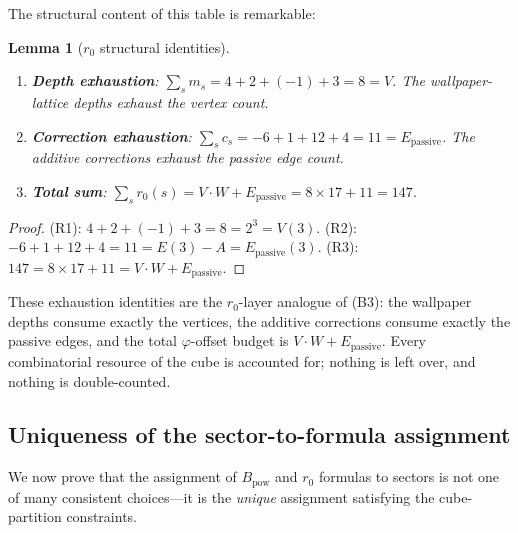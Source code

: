 \documentclass[11pt,a4paper]{article}
\newtheorem{lemma}[theorem]{Lemma}
\theoremstyle{definition}
\theoremstyle{remark}
\newcommand{\phig}{\varphi}
\newcommand{\Epass}{E_{\mathrm{passive}}}
\begin{document}
The structural content of this table is remarkable:

\begin{lemma}[$r_0$ structural identities]
\label{lem:r0_identities}
\leavevmode
\begin{enumerate}[nosep,label=(R\arabic*)]
  \item \textbf{Depth exhaustion}:
    $\sum_s m_s = 4 + 2 + (-1) + 3 = 8 = V$.
    The wallpaper-lattice depths exhaust the vertex count.
  \item \textbf{Correction exhaustion}:
    $\sum_s c_s = -6 + 1 + 12 + 4 = 11 = \Epass$.
    The additive corrections exhaust the passive edge count.
  \item \textbf{Total sum}:
    $\sum_s r_0(s) = V \cdot W + \Epass = 8 \times 17 + 11 = 147$.
\end{enumerate}
\end{lemma}

\begin{proof}
(R1): $4 + 2 + (-1) + 3 = 8 = 2^3 = V(3)$.\;
(R2): $-6 + 1 + 12 + 4 = 11 = E(3) - A = \Epass(3)$.\;
(R3): $147 = 8 \times 17 + 11 = V \cdot W + \Epass$.
\end{proof}

\noindent
These exhaustion identities are the $r_0$-layer analogue of (B3): the
wallpaper depths consume exactly the vertices, the additive corrections
consume exactly the passive edges, and the total $\phig$-offset budget is
$V \cdot W + \Epass$.  Every combinatorial resource of the cube is accounted
for; nothing is left over, and nothing is double-counted.

\subsection{Uniqueness of the sector-to-formula assignment}

We now prove that the assignment of $B_{\mathrm{pow}}$ and $r_0$ formulas to
sectors is not one of many consistent choices---it is the \emph{unique}
assignment satisfying the cube-partition constraints.
\end{document}
